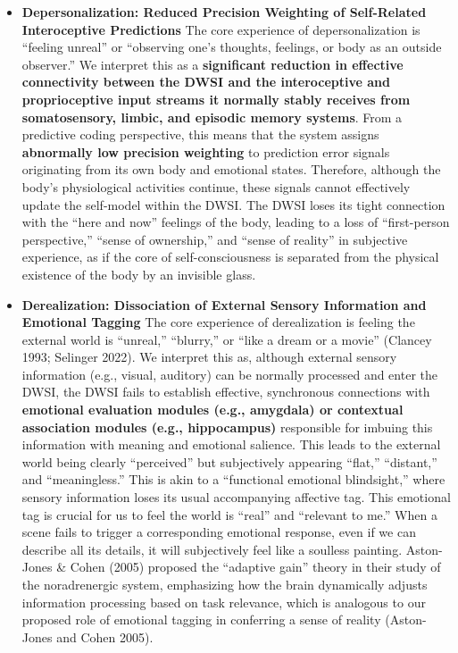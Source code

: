 \documentclass[
  a4paper]{article}
\begin{document}
\begin{itemize}
\item
  \textbf{Depersonalization: Reduced Precision Weighting of Self-Related
  Interoceptive Predictions} The core experience of depersonalization is
  ``feeling unreal'' or ``observing one's thoughts, feelings, or body as
  an outside observer.'' We interpret this as a \textbf{significant
  reduction in effective connectivity between the DWSI and the
  interoceptive and proprioceptive input streams it normally stably
  receives from somatosensory, limbic, and episodic memory systems}.
  From a predictive coding perspective, this means that the system
  assigns \textbf{abnormally low precision weighting} to prediction
  error signals originating from its own body and emotional states.
  Therefore, although the body's physiological activities continue,
  these signals cannot effectively update the self-model within the
  DWSI. The DWSI loses its tight connection with the ``here and now''
  feelings of the body, leading to a loss of ``first-person
  perspective,'' ``sense of ownership,'' and ``sense of reality'' in
  subjective experience, as if the core of self-consciousness is
  separated from the physical existence of the body by an invisible
  glass.
\item
  \textbf{Derealization: Dissociation of External Sensory Information
  and Emotional Tagging} The core experience of derealization is feeling
  the external world is ``unreal,'' ``blurry,'' or ``like a dream or a
  movie'' (Clancey 1993; Selinger 2022). We interpret this as, although
  external sensory information (e.g., visual, auditory) can be normally
  processed and enter the DWSI, the DWSI fails to establish effective,
  synchronous connections with \textbf{emotional evaluation modules
  (e.g., amygdala) or contextual association modules (e.g.,
  hippocampus)} responsible for imbuing this information with meaning
  and emotional salience. This leads to the external world being clearly
  ``perceived'' but subjectively appearing ``flat,'' ``distant,'' and
  ``meaningless.'' This is akin to a ``functional emotional
  blindsight,'' where sensory information loses its usual accompanying
  affective tag. This emotional tag is crucial for us to feel the world
  is ``real'' and ``relevant to me.'' When a scene fails to trigger a
  corresponding emotional response, even if we can describe all its
  details, it will subjectively feel like a soulless painting.
  Aston-Jones \& Cohen (2005) proposed the ``adaptive gain'' theory in
  their study of the noradrenergic system, emphasizing how the brain
  dynamically adjusts information processing based on task relevance,
  which is analogous to our proposed role of emotional tagging in
  conferring a sense of reality (Aston-Jones and Cohen 2005).
\end{itemize}
\end{document}
